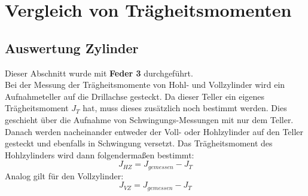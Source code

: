 \documentclass[12pt,a4paper]{article}
\begin{document}
\newpage

\section{Vergleich von Trägheitsmomenten}

\subsection{Auswertung Zylinder}
Dieser Abschnitt wurde mit \textbf{Feder 3} durchgeführt.\\
Bei der Messung der Trägheitsmomente von Hohl- und Vollzylinder wird ein Aufnahmeteller auf die Drillachse gesteckt. Da dieser Teller ein eigenes Trägheitsmoment $J_T$ hat, muss dieses zusätzlich noch bestimmt werden. Dies geschieht über die Aufnahme von Schwingungs-Messungen mit nur dem Teller. Danach werden nacheinander entweder der Voll- oder Hohlzylinder auf den Teller gesteckt und ebenfalls in Schwingung versetzt. Das Trägheitsmoment des Hohlzylinders wird dann folgendermaßen bestimmt:
\begin{equation}
J_{HZ} = J_{gemessen}-J_T
\end{equation}
Analog gilt für den Vollzylinder:
\begin{equation}
J_{VZ} = J_{gemessen}-J_T
\end{equation}
\end{document}
